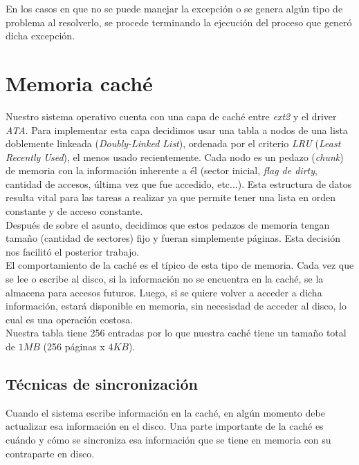 \documentclass[a4paper,10pt]{article}
\begin{document}
En los casos en que no se puede manejar la excepción o se genera algún tipo de problema al resolverlo, se procede terminando la ejecución del proceso que 
generó dicha excepción.

\newpage

\section{Memoria caché}

Nuestro sistema operativo cuenta con una capa de caché entre \textit{ext2} y el driver \textit{ATA}. Para implementar esta capa decidimos usar una tabla 
a nodos de una lista doblemente linkeada (\textit{Doubly-Linked List}), ordenada por el criterio \textit{LRU} (\textit{Least Recently Used}), el menos usado
 recientemente. Cada nodo es un pedazo (\textit{chunk}) de memoria con la información inherente a él (sector inicial, \textit{flag de dirty}, 
cantidad de accesos, última vez que fue accedido, etc...). Esta estructura de datos resulta vital para las tareas a realizar ya que permite tener una lista
en orden constante y de acceso constante.\\

Después de sobre el asunto, decidimos que estos pedazos de memoria tengan tamaño (cantidad de sectores)
fijo y fueran simplemente páginas. Esta decisión nos facilitó el posterior trabajo.\\

El comportamiento de la caché es el típico de esta tipo de memoria. Cada vez que se lee o escribe al disco, si la información no se encuentra en la caché, se
 la almacena para accesos futuros. Luego, si se quiere volver a acceder a dicha información, estará disponible en memoria, sin necesisdad de acceder al disco, lo 
cual es una operación costosa.\\


Nuestra tabla tiene 256 entradas por lo que nuestra caché tiene un tamaño total de $1 MB$ (256 páginas x $4 KB$).\\

        \subsection{Técnicas de sincronización}

        Cuando el sistema escribe información en la caché, en algún momento debe actualizar esa información en el disco. Una parte importante de la caché es cuándo y
        cómo se sincroniza esa información que se tiene en memoria con su contraparte en disco. \\
\end{document}
